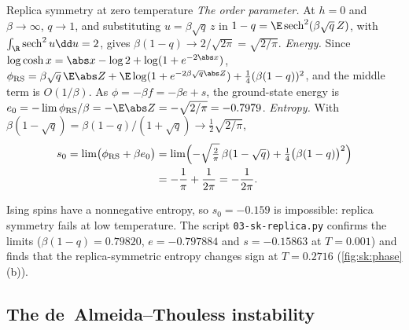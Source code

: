 \begin{refsection}
\begin{computation}{Replica symmetry at zero temperature}\label{comp:sk:zeroT}
\step \emph{The order parameter.} At $h=0$ and $\beta\to\infty$, $q\to1$, and substituting $u=\beta\sqrt q\,z$ in $1-q=\E\sksech^2(\beta\sqrt q\,Z)$, with $\int_\R\sksech^2u\dd u=2$, gives $\beta(1-q)\to2/\sqrt{2\pi}=\sqrt{2/\pi}$.
\step \emph{Energy.} Since $\log\cosh x=\abs x-\log2+\log(1+e^{-2\abs x})$, $\skRS=\beta\sqrt q\,\E\abs Z+\E\log(1+e^{-2\beta\sqrt q\abs Z})+\frac14(\beta(1-q))^2$, and the middle term is $O(1/\beta)$. As $\phi=-\beta f=-\beta e+s$, the ground-state energy is $e_0=-\lim\skRS/\beta=-\E\abs Z=-\sqrt{2/\pi}=-0.7979$.
\step \emph{Entropy.} With $\beta(1-\sqrt q)=\beta(1-q)/(1+\sqrt q)\to\frac12\sqrt{2/\pi}$,
\begin{align*}
s_0=\lim\bigl(\phi_{\mathrm{RS}}+\beta e_0\bigr)&=\lim\Bigl(-\sqrt{\tfrac2\pi}\,\beta(1-\sqrt q)+\tfrac14\bigl(\beta(1-q)\bigr)^2\Bigr)\\
&=-\frac1\pi+\frac1{2\pi}=-\frac1{2\pi}.
\end{align*}
\end{computation}

Ising spins have a nonnegative entropy, so $s_0=-0.159$ is impossible: replica symmetry fails at low temperature. The script \texttt{03-sk-replica.py} confirms the limits ($\beta(1-q)=0.79820$, $e=-0.797884$ and $s=-0.15863$ at $T=0.001$) and finds that the replica-symmetric entropy changes sign at $T=0.2716$ (\cref{fig:sk:phase}(b)).

\subsection{The de~Almeida--Thouless instability}\label{sec:sk:at}


\end{refsection}
